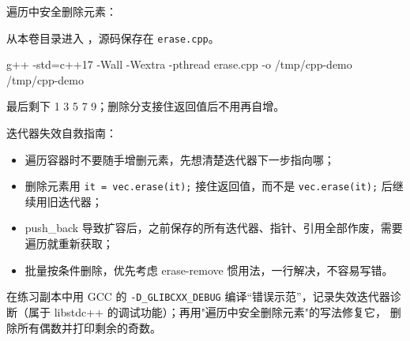 \begin{example}
遍历中安全删除元素：



从本卷目录进入 ，源码保存在 \texttt{erase.cpp}。
\begin{tbash}
g++ -std=c++17 -Wall -Wextra -pthread erase.cpp -o /tmp/cpp-demo
/tmp/cpp-demo
\end{tbash}
最后剩下 1 3 5 7 9；删除分支接住返回值后不用再自增。
\end{example}

\begin{conclusion}
迭代器失效自救指南：

\begin{itemize}
\item 遍历容器时不要随手增删元素，先想清楚迭代器下一步指向哪；
\item 删除元素用 \texttt{it = vec.erase(it);} 接住返回值，而不是 \texttt{vec.erase(it);} 后继续用旧迭代器；
\item push\_back 导致扩容后，之前保存的所有迭代器、指针、引用全部作废，需要遍历就重新获取；
\item 批量按条件删除，优先考虑 erase-remove 惯用法，一行解决，不容易写错。
\end{itemize}
\end{conclusion}

\begin{exercise}\label{ex:v1-cpp-erase}

在练习副本中用 GCC 的 \texttt{-D\_GLIBCXX\_DEBUG} 编译“错误示范”，记录失效迭代器诊断（属于 libstdc++ 的调试功能）；再用"遍历中安全删除元素"的写法修复它，
删除所有偶数并打印剩余的奇数。
\end{exercise}
